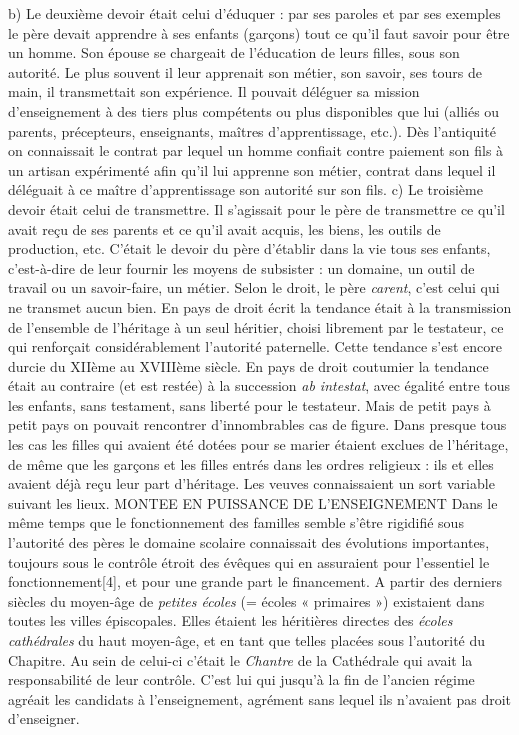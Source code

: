  b) Le deuxième devoir était celui d'éduquer : par ses paroles et par ses exemples le père devait apprendre à ses enfants (garçons) tout ce qu'il faut savoir pour être un homme. Son épouse se chargeait de l'éducation de leurs filles, sous son autorité. Le plus souvent il leur apprenait son métier, son savoir, ses tours de main, il transmettait son expérience. Il pouvait déléguer sa mission d'enseignement à des tiers plus compétents ou plus disponibles que lui (alliés ou parents, précepteurs, enseignants, maîtres d'apprentissage, etc.). Dès l'antiquité on connaissait le contrat par lequel un homme confiait contre paiement son fils à un artisan expérimenté afin qu'il lui apprenne son métier, contrat dans lequel il déléguait à ce maître d'apprentissage son autorité sur son fils. 
 c) Le troisième devoir était celui de transmettre. Il s'agissait pour le père de transmettre ce qu'il avait reçu de ses parents et ce qu'il avait acquis, les biens, les outils de production, etc. C'était le devoir du père d'établir dans la vie tous ses enfants, c'est-à-dire de leur fournir les moyens de subsister : un domaine, un outil de travail ou un savoir-faire, un métier. Selon le droit, le père \emph{carent}, c'est celui qui ne transmet aucun bien. En pays de droit écrit la tendance était à la transmission de l'ensemble de l'héritage à un seul héritier, choisi librement par le testateur, ce qui renforçait considérablement l'autorité paternelle. Cette tendance s'est encore durcie du XIIème au XVIIIème siècle. En pays de droit coutumier la tendance était au contraire (et est restée) à la succession \emph{ab intestat}, avec égalité entre tous les enfants, sans testament, sans liberté pour le testateur. Mais de petit pays à petit pays on pouvait rencontrer d'innombrables cas de figure. Dans presque tous les cas les filles qui avaient été dotées pour se marier étaient exclues de l'héritage, de même que les garçons et les filles entrés dans les ordres religieux : ils et elles avaient déjà reçu leur part d'héritage. Les veuves connaissaient un sort variable suivant les lieux. 
MONTEE EN PUISSANCE DE L'ENSEIGNEMENT
 Dans le même temps que le fonctionnement des familles semble s'être rigidifié sous l'autorité des pères le domaine scolaire connaissait des évolutions importantes, toujours sous le contrôle étroit des évêques qui en assuraient pour l'essentiel le fonctionnement[4], et pour une grande part le financement.
 A partir des derniers siècles du moyen-âge de \emph{petites écoles} (= écoles « primaires ») existaient dans toutes les villes épiscopales. Elles étaient les héritières directes des \emph{écoles cathédrales} du haut moyen-âge, et en tant que telles placées sous l'autorité du Chapitre. Au sein de celui-ci c'était le \emph{Chantre} de la Cathédrale qui avait la responsabilité de leur contrôle. C'est lui qui jusqu'à la fin de l'ancien régime agréait les candidats à l'enseignement, agrément sans lequel ils n'avaient pas droit d'enseigner. 
